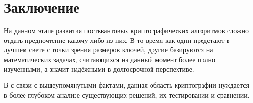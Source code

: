 \section{Заключение}

На данном этапе развития постквантовых криптографических алгоритмов сложно отдать предпочтение какому либо из них. В то время как одни предстают в лучшем свете с точки зрения размеров ключей, другие базируются на математических задачах, считающихся на данный момент более полно изученными, а значит надёжными в долгосрочной перспективе.

В с связи с вышеупомянутыми фактами, данная область криптографии нуждается в более глубоком анализе существующих решений, их тестировании и сравнении.

\clearpage
